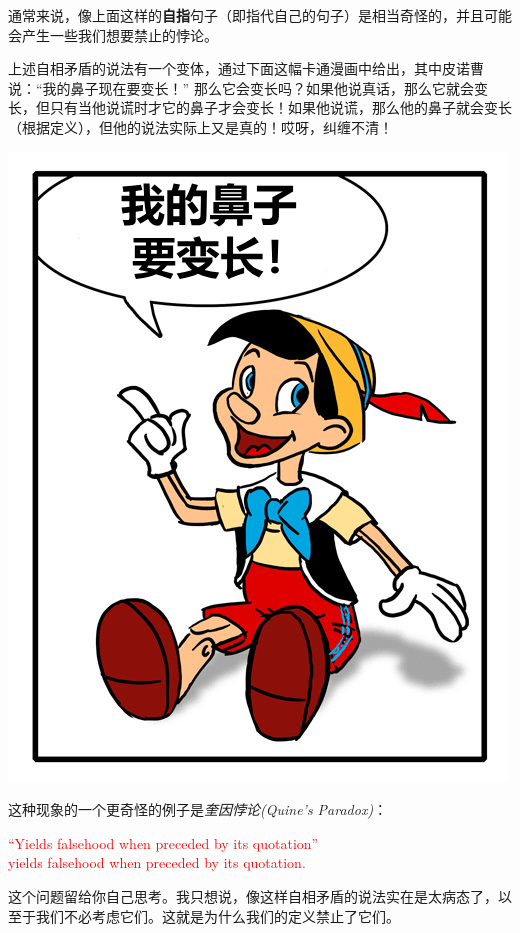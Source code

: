 通常来说，像上面这样的\textbf{自指}句子（即指代自己的句子）是相当奇怪的，并且可能会产生一些我们想要禁止的悖论。

上述自相矛盾的说法有一个变体，通过下面这幅卡通漫画中给出，其中皮诺曹说：``我的鼻子现在要变长！'' 那么它会变长吗？如果他说真话，那么它就会变长，但只有当他说谎时才它的鼻子才会变长！如果他说谎，那么他的鼻子就会变长（根据定义），但他的说法实际上又是真的！哎呀，纠缠不清！
\begin{center}
    \includegraphics[scale=0.4]{figure/pinocchio.png}
\end{center}

这种现象的一个更奇怪的例子是\emph{奎因悖论(Quine's Paradox)}：
\begin{center}
    \textcolor{red}{``Yields falsehood when preceded by its quotation'' \\yields falsehood when preceded by its quotation.}
\end{center}
这个问题留给你自己思考。我只想说，像这样自相矛盾的说法实在是太病态了，以至于我们不必考虑它们。这就是为什么我们的定义禁止了它们。

